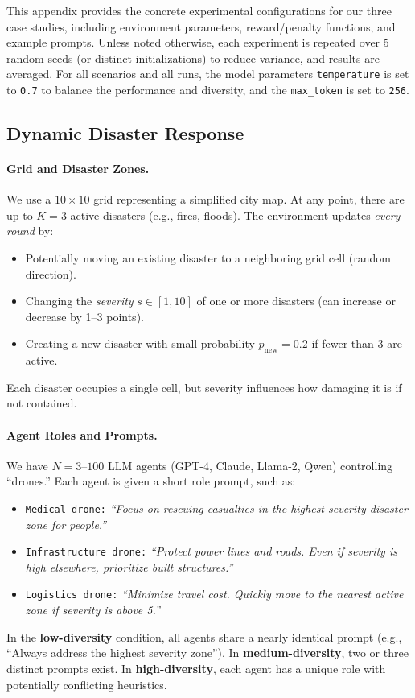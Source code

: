 This appendix provides the concrete experimental configurations for our three case studies, including environment parameters, reward/penalty functions, and example prompts. Unless noted otherwise, each experiment is repeated over 5 random seeds (or distinct initializations) to reduce variance, and results are averaged. For all scenarios and all runs, the model parameters \texttt{temperature} is set to \texttt{0.7} to balance the performance and diversity, and the \texttt{max\_token} is set to \texttt{256}.

\subsection{Dynamic Disaster Response}
\label{appendix:disaster}

\paragraph{Grid and Disaster Zones.}
We use a $10\times10$ grid representing a simplified city map. At any point, there are up to $K=3$ active disasters (e.g., fires, floods). The environment updates \emph{every round} by:
\begin{itemize}
    \item Potentially moving an existing disaster to a neighboring grid cell (random direction).
    \item Changing the \emph{severity} $s \in [1,10]$ of one or more disasters (can increase or decrease by 1--3 points).
    \item Creating a new disaster with small probability $p_{\text{new}}=0.2$ if fewer than 3 are active.
\end{itemize}
Each disaster occupies a single cell, but severity influences how damaging it is if not contained.

\paragraph{Agent Roles and Prompts.}
We have $N=3$--$100$ LLM agents (GPT-4, Claude, Llama-2, Qwen) controlling “drones.” Each agent is given a short role prompt, such as:
\begin{itemize}
    \item \texttt{Medical drone:} \emph{``Focus on rescuing casualties in the highest-severity disaster zone for people.''}
    \item \texttt{Infrastructure drone:} \emph{``Protect power lines and roads. Even if severity is high elsewhere, prioritize built structures.''}
    \item \texttt{Logistics drone:} \emph{``Minimize travel cost. Quickly move to the nearest active zone if severity is above 5.''}
\end{itemize}
In the \textbf{low-diversity} condition, all agents share a nearly identical prompt (e.g., “Always address the highest severity zone”). In \textbf{medium-diversity}, two or three distinct prompts exist. In \textbf{high-diversity}, each agent has a unique role with potentially conflicting heuristics.

